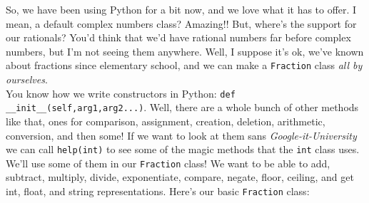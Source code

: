 \documentclass[12pt]{article}
\begin{document}
So, we have been using Python for a bit now, and we love what it has to offer. I mean, a default complex numbers class? Amazing!! But, where's the support for our rationals? You'd think that we'd have rational numbers far before complex numbers, but I'm not seeing them anywhere. Well, I suppose it's ok, we've known about fractions since elementary school, and we can make a \texttt{Fraction} class \textit{all by ourselves}.\\
You know how we write constructors in Python: \texttt{def \_\_init\_\_(self,arg1,arg2...)}. Well, there are a whole bunch of other methods like that, ones for comparison, assignment, creation, deletion, arithmetic, conversion, and then some! If we want to look at them sans \textit{Google-it-University} we can call \texttt{help(int)} to see some of the magic methods that the \texttt{int} class uses. We'll use some of them in our \texttt{Fraction} class! We want to be able to add, subtract, multiply, divide, exponentiate, compare, negate, floor, ceiling, and get int, float, and string representations. Here's our basic \texttt{Fraction} class:\\
\end{document}
